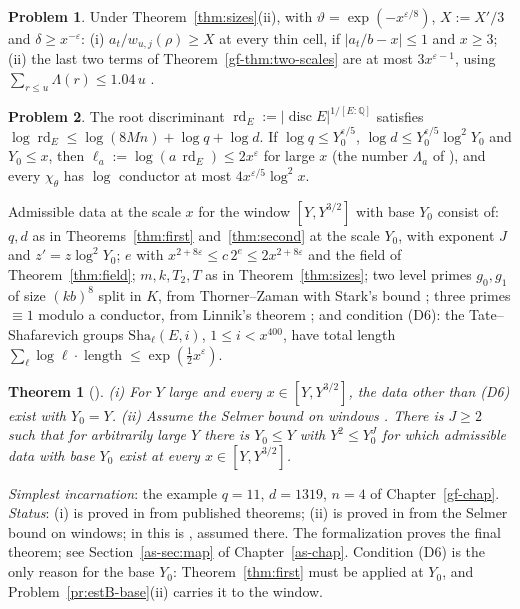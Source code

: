 \documentclass[reqno]{amsart}
\newcounter{chap}
\theoremstyle{definition}
\newtheorem{problem}{Problem}[section]
\theoremstyle{plain}
\newtheorem{theorem}{Theorem}[section]
\newcommand{\Q}{\mathbb{Q}}
\newcommand{\rd}{\operatorname{rd}}
\begin{document}
\begin{problem}\label{pr:nodes}
Under Theorem~\ref{thm:sizes}(ii), with \(\vartheta = \exp(-x^{\varepsilon/8})\), \(X := X'/3\) and \(\delta \ge x^{-\varepsilon}\):
(i) \(a_t/w_{u,j}(\rho) \ge X\) at every thin cell, if \(\lvert a_t/b - x \rvert \le 1\) and \(x \ge 3\);
(ii) the last two terms of Theorem~\ref{gf-thm:two-scales} are at most \(3x^{\varepsilon - 1}\), using \(\sum_{r \le u}\Lambda(r) \le 1.04\,u\) \cite{RS}.
\end{problem}

\begin{problem}\label{pr:rd}
The root discriminant \(\rd_E := \lvert\operatorname{disc}E\rvert^{1/[E:\Q]}\) satisfies \(\log\rd_E \le \log(8Mn) + \log q + \log d\).  If \(\log q \le Y_0^{\varepsilon/5}\), \(\log d \le Y_0^{\varepsilon/5}\log^2Y_0\) and \(Y_0 \le x\), then \(\ell_a := \log(a\,\rd_E) \le 2x^\varepsilon\) for large \(x\) (the number \(\Lambda_a\) of \cite[Lemma~18.15(iii)]{Adr}), and every \(\chi_\theta\) has \(\log\) conductor at most \(4x^{\varepsilon/5}\log^2x\).
\end{problem}

Admissible data at the scale \(x\) for the window \([Y, Y^{3/2}]\) with base \(Y_0\) \cite[Def.~18.1]{Adr} consist of: \(q, d\) as in Theorems~\ref{thm:first} and~\ref{thm:second} at the scale \(Y_0\), with exponent \(J\) and \(z' = z\log^2Y_0\); \(e\) with \(x^{2+8\varepsilon} \le c\,2^e \le 2x^{2+8\varepsilon}\) and the field of Theorem~\ref{thm:field}; \(m, k, T_2, T\) as in Theorem~\ref{thm:sizes}; two level primes \(g_0, g_1\) of size \((kb)^8\) split in \(K\), from Thorner--Zaman \cite{TZ} with Stark's bound \cite{Sta}; three primes \(\equiv 1\) modulo a conductor, from Linnik's theorem \cite{Lin}; and condition (D6): the Tate--Shafarevich groups \(\mathrm{Sha}_\ell(E, i)\), \(1 \le i < x^{400}\), have total length \(\sum_\ell \log \ell\cdot\operatorname{length} \le \exp(\frac12x^\varepsilon)\).

\begin{theorem}[{\cite[Prop.~6.2 and Prop.~18.4]{Adr}}]\label{thm:data}
(i) For \(Y\) large and every \(x \in [Y, Y^{3/2}]\), the data other than (D6) exist with \(Y_0 = Y\).
(ii) Assume the Selmer bound on windows \cite[Hyp.~17.11]{Adr}.  There is \(J \ge 2\) such that for arbitrarily large \(Y\) there is \(Y_0 \le Y\) with \(Y^2 \le Y_0^J\) for which admissible data with base \(Y_0\) exist at every \(x \in [Y, Y^{3/2}]\).
\end{theorem}

\noindent\emph{Simplest incarnation}: the example \(q = 11\), \(d = 1319\), \(n = 4\) of Chapter~\ref{gf-chap}.  \emph{Status}: (i) is proved in \cite{Adr} from published theorems; (ii) is proved in \cite{Adr} from the Selmer bound on windows; in \cite{Adr} this is \cite[Hyp.~17.11]{Adr}, assumed there.  The formalization proves the final theorem; see Section~\ref{as-sec:map} of Chapter~\ref{as-chap}.  Condition (D6) is the only reason for the base \(Y_0\): Theorem~\ref{thm:first} must be applied at \(Y_0\), and Problem~\ref{pr:estB-base}(ii) carries it to the window.
\end{document}
